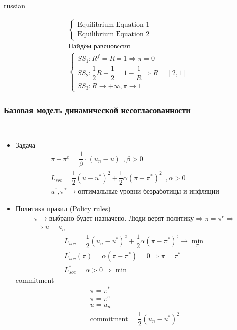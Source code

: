 \documentclass{article}
\begin{document}
\begin{otherlanguage*}{russian}
\begin{itemize}
\begin{align*}
\begin{cases}
\text{Equilibrium Equation } 1 \\
\text{Equilibrium Equation } 2 
\end{cases} \\
\text{Найдём равеновесия} \\
\begin{cases}
SS_1: R^f = R = 1 \Rightarrow \pi = 0 \\
SS_2: \dfrac{1}{2} R - \dfrac{1}{2} = 1 - \dfrac{1}{R} \Rightarrow R = [2, 1] \\
SS_3: R \rightarrow + \infty, \pi \rightarrow 1 		
\end{cases}
\end{align*}
\end{itemize}
\subsubsection*{Базовая модель динамической несогласованности}\
\begin{itemize}
\item Задача
\begin{align*}
\pi - \pi^e = \dfrac{1}{\beta} \cdot ( u_n - u) \,\,\, , \beta > 0 \\
L_{soc} = \dfrac{1}{2} (u - u^*)^2 + \dfrac{1}{2} \alpha (\pi - \pi^* ) ^  2 \,\,\, , \alpha > 0 \\
u^*, \pi ^* \rightarrow \text{оптимальные уровни безработицы и инфляции} 
\end{align*}
\item Политика правил (Policy rules) 
\begin{align*}
\pi \rightarrow \text{выбрано будет назначено. Люди верят политику} \Rightarrow \pi = \pi^ e \Rightarrow \\
\Rightarrow u = u_n  
\end{align*}
\begin{align*}
L_{soc} = \dfrac{1}{2} (u_n - u^* )^ 2 + \dfrac{1}{2} \alpha (\pi - \pi ^* ) ^ 2 \rightarrow \min_{\pi} \\
L_{soc}^{'} (\pi) = \alpha (\pi - \pi^*) = 0 \Rightarrow \pi = \pi^* \\
L^{''}_{soc} = \alpha > 0 \Rightarrow \min 
\end{align*}
commitment
\begin{align*}
\pi = \pi^* \\
\pi = \pi^e \\
u = u_n \\
\text{commitment} = \dfrac{1}{2} ( u_n - u^* ) ^ 2 
\end{align*}

\end{itemize}
\end{otherlanguage*}
\end{document}
